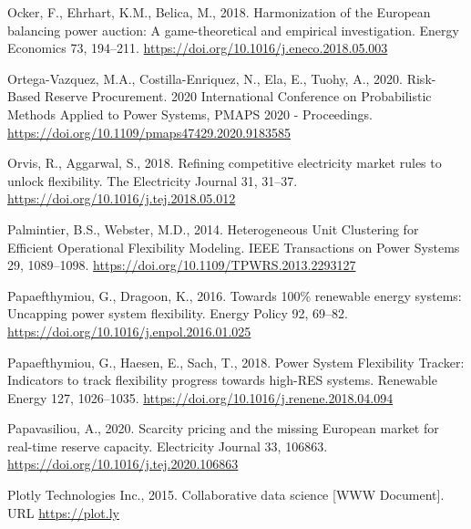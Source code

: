 \documentclass[12pt,a4paper,]{report}
\newlength{\cslhangindent}
\newenvironment{CSLReferences}[2] %
 {%
  \setlength{\parindent}{0pt}
  \ifodd #1 \everypar{\setlength{\hangindent}{\cslhangindent}}\ignorespaces\fi
  \ifnum #2 > 0
  \setlength{\parskip}{#2\baselineskip}
  \fi
 }%
 {}
\begin{document}
\begin{CSLReferences}{1}{0}
\leavevmode{}%
Ocker, F., Ehrhart, K.M., Belica, M., 2018. Harmonization of the
{European} balancing power auction: {A} game-theoretical and empirical
investigation. Energy Economics 73, 194--211.
\url{https://doi.org/10.1016/j.eneco.2018.05.003}

\leavevmode{}%
Ortega-Vazquez, M.A., Costilla-Enriquez, N., Ela, E., Tuohy, A., 2020.
Risk-{Based Reserve Procurement}. 2020 International Conference on
Probabilistic Methods Applied to Power Systems, PMAPS 2020 -
Proceedings. \url{https://doi.org/10.1109/pmaps47429.2020.9183585}

\leavevmode{}%
Orvis, R., Aggarwal, S., 2018. Refining competitive electricity market
rules to unlock flexibility. The Electricity Journal 31, 31--37.
\url{https://doi.org/10.1016/j.tej.2018.05.012}

\leavevmode{}%
Palmintier, B.S., Webster, M.D., 2014. Heterogeneous {Unit Clustering}
for {Efficient Operational Flexibility Modeling}. IEEE Transactions on
Power Systems 29, 1089--1098.
\url{https://doi.org/10.1109/TPWRS.2013.2293127}

\leavevmode{}%
Papaefthymiou, G., Dragoon, K., 2016. Towards 100\% renewable energy
systems: {Uncapping} power system flexibility. Energy Policy 92, 69--82.
\url{https://doi.org/10.1016/j.enpol.2016.01.025}

\leavevmode{}%
Papaefthymiou, G., Haesen, E., Sach, T., 2018. Power {System Flexibility
Tracker}: {Indicators} to track flexibility progress towards high-{RES}
systems. Renewable Energy 127, 1026--1035.
\url{https://doi.org/10.1016/j.renene.2018.04.094}

\leavevmode{}%
Papavasiliou, A., 2020. Scarcity pricing and the missing {European}
market for real-time reserve capacity. Electricity Journal 33, 106863.
\url{https://doi.org/10.1016/j.tej.2020.106863}

\leavevmode{}%
Plotly Technologies Inc., 2015. Collaborative data science {[}WWW
Document{]}. URL \url{https://plot.ly}


\end{CSLReferences}
\end{document}
